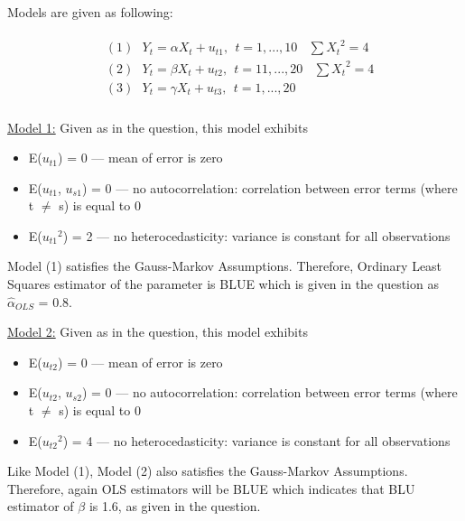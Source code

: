 \documentclass{article}
\begin{document}
\section{}

Models are given as following:

\begin{align}
    \begin{split}
        &(1) \ \ \ Y_t = \alpha X_t + u_{t1}, \ \  t=1,...,10  \ \ \ \  \sum {X_t}^2 = 4 \\
        &(2) \ \ \ Y_t = \beta X_t + u_{t2}, \ \  t=11,...,20  \ \ \ \  \sum {X_t}^2 = 4 \\
        &(3) \ \ \ Y_t = \gamma X_t + u_{t3}, \ \  t=1,...,20  
    \end{split}
\end{align}
\\

\underline{Model 1:} Given as in the question, this model exhibits
\begin{itemize}
    \item E($u_{t1}$) = 0  --- mean of error is zero
    \item E($u_{t1}$, $u_{s1}$) = 0  ---  no autocorrelation: correlation between error terms (where t $\neq$ s) is equal to 0
    \item E(${u_{t1}}^2$) = 2 --- no heterocedasticity: variance is constant for all observations 
\end{itemize}

Model (1) satisfies the Gauss-Markov Assumptions.
Therefore, Ordinary Least Squares estimator of the parameter is BLUE which is given in the question as $\hat{\alpha}_{OLS}$ = 0.8. 

\newpage

\underline{Model 2:} Given as in the question, this model exhibits
\begin{itemize}
    \item E($u_{t2}$) = 0  --- mean of error is zero
    \item E($u_{t2}$, $u_{s2}$) = 0  ---  no autocorrelation: correlation between error terms (where t $\neq$ s) is equal to 0
    \item E(${u_{t2}}^2$) = 4 --- no heterocedasticity: variance is constant for all observations 
\end{itemize}

Like Model (1), Model (2) also satisfies the Gauss-Markov Assumptions. Therefore, again OLS estimators will be BLUE which indicates that BLU estimator of $\beta$ is 1.6, as given in the question.
\\
\end{document}
